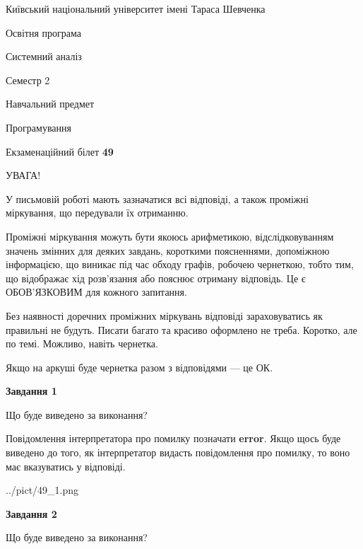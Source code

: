\documentclass[12pt, ukrainian]{article}
\begin{document}
{{\begin {small}\par
{ \center  Київський національний університет імені Тараса Шевченка \par}
{\parbox {5 cm}{Освітня програма \hfill}{\parbox {7 cm}{Системний аналіз \hfill}}\parbox {6 cm}{\hfill Семестр 2}}\par
{\parbox {5 cm} {Навчальний предмет \hfill}\parbox {7 cm}{Програмування \hfill}\parbox {6cm}{\hfill}\par}\vspace{-7pt} \end{small}}{\center Екзаменаційний білет \No \textbf
{ 49 }\par}}
{
\begin {large}
УВАГА!

У письмовій роботі мають зазначатися всі відповіді, а також проміжні міркування, що передували їх отриманню.

Проміжні міркування можуть бути якоюсь арифметикою, відслідковуванням зна\-чень змінних для деяких завдань,
короткими поясненнями, допоміжною інформацією, що виникає під час обходу графів, робочею чернеткою,
тобто тим, що відображає хід розв’язання або пояснює отриману відповідь.
Це є ОБОВ’ЯЗКОВИМ для кожного запитання.

Без наявності доречних проміжних міркувань відповіді зараховуватись як правиль\-ні не будуть.
Писати багато та красиво оформлено не треба. Коротко, але по темі. Можли\-во, навіть чернетка.

Якщо на аркуші буде чернетка разом з відповідями --- це ОК.

\newpage

{\begin {center}\textbf{Завдання 1}\end {center}}\par
Що буде виведено за виконання?

Повідомлення інтерпретатора про помилку позначати \textbf{error}.
Якщо щось буде виведено до того, як інтерпретатор видасть повідомлення про помилку, 
то воно має вказуватись у відповіді. \par


\begin{center}
	{../pict/49_1.png}
\end{center}
\newpage

{\begin {center}\textbf{Завдання 2}\end {center}}\par
Що буде виведено за виконання?


\end{large}}
\end{document}
